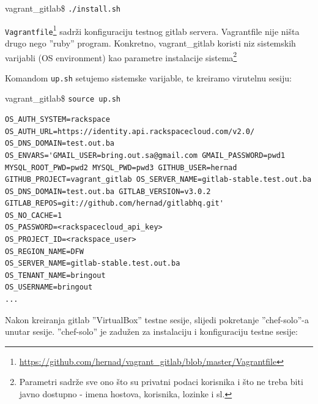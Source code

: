 \documentclass[times, utf8, seminar]{fit}
\begin{document}
vagrant\_gitlab\$ \verb+./install.sh+

\verb+Vagrantfile+\footnote{\url{https://github.com/hernad/vagrant\_gitlab/blob/master/Vagrantfile}} sadrži konfiguraciju testnog gitlab servera. Vagrantfile nije ništa drugo nego ''ruby'' program. Konkretno, vagrant\_gitlab koristi niz sistemskih varijabli (OS environment)  kao parametre instalacije sistema\footnote{Parametri sadrže sve ono što su privatni podaci korisnika i što ne treba biti javno dostupno - imena hostova, korisnika, lozinke i sl.}

Komandom \verb+up.sh+ setujemo sistemske varijable, te kreiramo virutelnu sesiju:

vagrant\_gitlab\$ \verb+source up.sh+
\begin{lstlisting}
OS_AUTH_SYSTEM=rackspace
OS_AUTH_URL=https://identity.api.rackspacecloud.com/v2.0/
OS_DNS_DOMAIN=test.out.ba
OS_ENVARS='GMAIL_USER=bring.out.sa@gmail.com GMAIL_PASSWORD=pwd1 MYSQL_ROOT_PWD=pwd2 MYSQL_PWD=pwd3 GITHUB_USER=hernad GITHUB_PROJECT=vagrant_gitlab OS_SERVER_NAME=gitlab-stable.test.out.ba OS_DNS_DOMAIN=test.out.ba GITLAB_VERSION=v3.0.2 GITLAB_REPOS=git://github.com/hernad/gitlabhq.git'
OS_NO_CACHE=1
OS_PASSWORD=<rackspacecloud_api_key>
OS_PROJECT_ID=<rackspace_user>
OS_REGION_NAME=DFW
OS_SERVER_NAME=gitlab-stable.test.out.ba
OS_TENANT_NAME=bringout
OS_USERNAME=bringout
...
\end{lstlisting}

Nakon kreiranja gitlab ''VirtualBox'' testne sesije, slijedi pokretanje ''chef-solo''-a unutar sesije. ''chef-solo'' je zadužen za instalaciju i konfiguraciju testne sesije:
\end{document}
